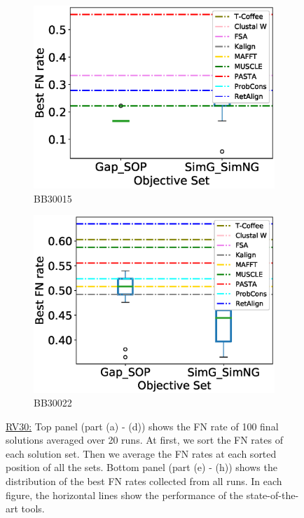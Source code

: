 \begin{figure}[!htbp]
\begin{adjustwidth}{-1cm}{-1cm}
\begin{subfigure}{0.22\textwidth}
			\includegraphics[width=\columnwidth]{Figure/summary/precomputedInit/Balibase/BB30015_objset_fnrate_rank}
			\caption{BB30015}
		\end{subfigure}
		\begin{subfigure}{0.22\textwidth}
			\includegraphics[width=\columnwidth]{Figure/summary/precomputedInit/Balibase/BB30022_objset_fnrate_rank}
			\caption{BB30022}
		\end{subfigure}
		\end{adjustwidth}
		\caption[FN rate results on RV30]{\underline{RV30:} Top panel (part (a) - (d)) shows the FN rate of 100 final solutions averaged over 20 runs. At first, we sort the FN rates of each solution set. Then we average the FN rates at each sorted position of all the sets. Bottom panel (part (e) - (h)) shows the distribution of the best FN rates collected from all runs. In each figure, the horizontal lines show the performance of the state-of-the-art tools.}
		\label{fig:rv30_fn_rate}

\end{figure}



